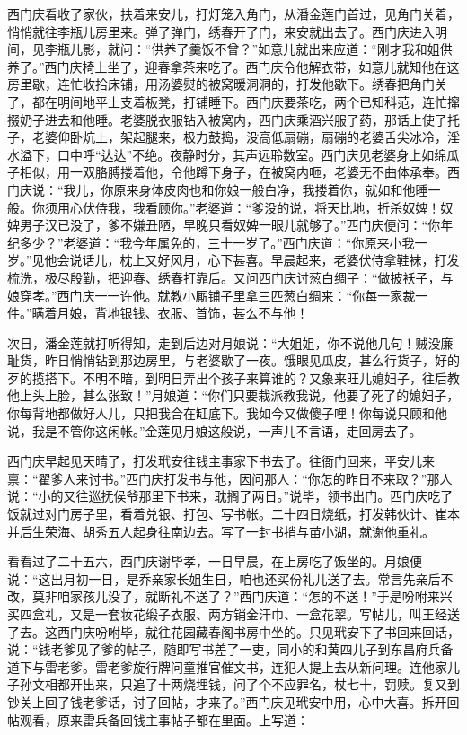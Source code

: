 西门庆看收了家伙，扶着来安儿，打灯笼入角门，从潘金莲门首过，见角门关着，悄悄就往李瓶儿房里来。弹了弹门，绣春开了门，来安就出去了。西门庆进入明间，见李瓶儿影，就问：“供养了羹饭不曾？”如意儿就出来应道：“刚才我和姐供养了。”西门庆椅上坐了，迎春拿茶来吃了。西门庆令他解衣带，如意儿就知他在这房里歇，连忙收拾床铺，用汤婆熨的被窝暖洞洞的，打发他歇下。绣春把角门关了，都在明间地平上支着板凳，打铺睡下。西门庆要茶吃，两个已知科范，连忙撺掇奶子进去和他睡。老婆脱衣服钻入被窝内，西门庆乘酒兴服了药，那话上使了托子，老婆仰卧炕上，架起腿来，极力鼓捣，没高低扇磞，扇磞的老婆舌尖冰冷，淫水溢下，口中呼“达达”不绝。夜静时分，其声远聆数室。西门庆见老婆身上如绵瓜子相似，用一双胳膊搂着他，令他蹲下身子，在被窝内咂\textMaoJi \textMaoBa ，老婆无不曲体承奉。西门庆说：“我儿，你原来身体皮肉也和你娘一般白净，我搂着你，就如和他睡一般。你须用心伏侍我，我看顾你。”老婆道：“爹没的说，将天比地，折杀奴婢！奴婢男子汉已没了，爹不嫌丑陋，早晚只看奴婢一眼儿就够了。”西门庆便问：“你年纪多少？”老婆道：“我今年属免的，三十一岁了。”西门庆道：“你原来小我一岁。”见他会说话儿，枕上又好风月，心下甚喜。早晨起来，老婆伏侍拿鞋袜，打发梳洗，极尽殷勤，把迎春、绣春打靠后。又问西门庆讨葱白绸子：“做披袄子，与娘穿孝。”西门庆一一许他。就教小厮铺子里拿三匹葱白绸来：“你每一家裁一件。”瞒着月娘，背地银钱、衣服、首饰，甚么不与他！

次日，潘金莲就打听得知，走到后边对月娘说：“大姐姐，你不说他几句！贼没廉耻货，昨日悄悄钻到那边房里，与老婆歇了一夜。饿眼见瓜皮，甚么行货子，好的歹的揽搭下。不明不暗，到明日弄出个孩子来算谁的？又象来旺儿媳妇子，往后教他上头上脸，甚么张致！”月娘道：“你们只要栽派教我说，他要了死了的媳妇子，你每背地都做好人儿，只把我合在缸底下。我如今又做傻子哩！你每说只顾和他说，我是不管你这闲帐。”金莲见月娘这般说，一声儿不言语，走回房去了。

西门庆早起见天晴了，打发玳安往钱主事家下书去了。往衙门回来，平安儿来禀：“翟爹人来讨书。”西门庆打发书与他，因问那人：“你怎的昨日不来取？”那人说：“小的又往巡抚侯爷那里下书来，耽搁了两日。”说毕，领书出门。西门庆吃了饭就过对门房子里，看着兑银、打包、写书帐。二十四日烧纸，打发韩伙计、崔本并后生荣海、胡秀五人起身往南边去。写了一封书捎与苗小湖，就谢他重礼。

看看过了二十五六，西门庆谢毕孝，一日早晨，在上房吃了饭坐的。月娘便说：“这出月初一日，是乔亲家长姐生日，咱也还买份礼儿送了去。常言先亲后不改，莫非咱家孩儿没了，就断礼不送了？”西门庆道：“怎的不送！”于是吩咐来兴买四盒礼，又是一套妆花缎子衣服、两方销金汗巾、一盒花翠。写帖儿，叫王经送了去。这西门庆吩咐毕，就往花园藏春阁书房中坐的。只见玳安下了书回来回话，说：“钱老爹见了爹的帖子，随即写书差了一吏，同小的和黄四儿子到东昌府兵备道下与雷老爹。雷老爹旋行牌问童推官催文书，连犯人提上去从新问理。连他家儿子孙文相都开出来，只追了十两烧埋钱，问了个不应罪名，杖七十，罚赎。复又到钞关上回了钱老爹话，讨了回帖，才来了。”西门庆见玳安中用，心中大喜。拆开回帖观看，原来雷兵备回钱主事帖子都在里面。上写道：

